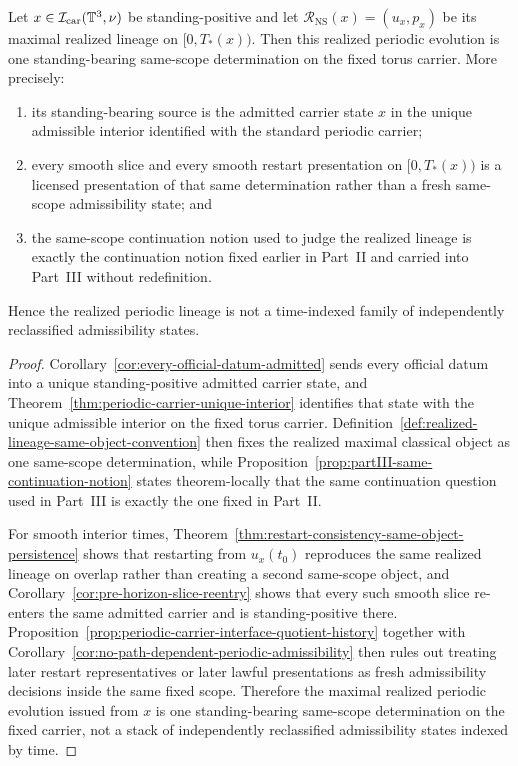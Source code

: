 \begin{manualtheorem}
\label{thm:carrier-to-lineage-binding}
Let $x\in\mathcal I_{\mathrm{car}}(\mathbb{T}^3,\nu)$ be standing-positive and let $\mathcal R_{\mathrm{NS}}(x)=(u_x,p_x)$ be its maximal realized lineage on $[0,T_*(x))$. Then this realized periodic evolution is one standing-bearing same-scope determination on the fixed torus carrier. More precisely:
\begin{enumerate}[label=(\roman*), leftmargin=2.2em]
\item its standing-bearing source is the admitted carrier state $x$ in the unique admissible interior identified with the standard periodic carrier;
\item every smooth slice and every smooth restart presentation on $[0,T_*(x))$ is a licensed presentation of that same determination rather than a fresh same-scope admissibility state; and
\item the same-scope continuation notion used to judge the realized lineage is exactly the continuation notion fixed earlier in Part~II and carried into Part~III without redefinition.
\end{enumerate}
Hence the realized periodic lineage is not a time-indexed family of independently reclassified admissibility states.
\end{manualtheorem}

\begin{proof}
Corollary~\ref{cor:every-official-datum-admitted} sends every official datum into a unique standing-positive admitted carrier state, and Theorem~\ref{thm:periodic-carrier-unique-interior} identifies that state with the unique admissible interior on the fixed torus carrier. Definition~\ref{def:realized-lineage-same-object-convention} then fixes the realized maximal classical object as one same-scope determination, while Proposition~\ref{prop:partIII-same-continuation-notion} states theorem-locally that the same continuation question used in Part~III is exactly the one fixed in Part~II.

For smooth interior times, Theorem~\ref{thm:restart-consistency-same-object-persistence} shows that restarting from $u_x(t_0)$ reproduces the same realized lineage on overlap rather than creating a second same-scope object, and Corollary~\ref{cor:pre-horizon-slice-reentry} shows that every such smooth slice re-enters the same admitted carrier and is standing-positive there. Proposition~\ref{prop:periodic-carrier-interface-quotient-history} together with Corollary~\ref{cor:no-path-dependent-periodic-admissibility} then rules out treating later restart representatives or later lawful presentations as fresh admissibility decisions inside the same fixed scope. Therefore the maximal realized periodic evolution issued from $x$ is one standing-bearing same-scope determination on the fixed carrier, not a stack of independently reclassified admissibility states indexed by time.
\end{proof}

